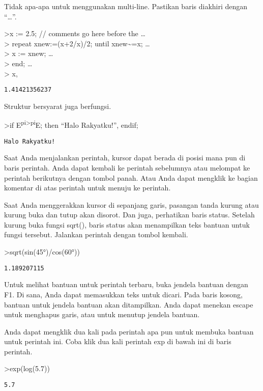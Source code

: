 \documentclass[
]{book}
\begin{document}
Tidak apa-apa untuk menggunakan multi-line. Pastikan baris diakhiri dengan ``\ldots{}''.

\textgreater x := 2.5; // comments go here before the \ldots{}\\
\textgreater{} repeat xnew:=(x+2/x)/2; until xnew\textasciitilde=x; \ldots{}\\
\textgreater{} x := xnew; \ldots{}\\
\textgreater{} end; \ldots{}\\
\textgreater{} x,

\begin{verbatim}
1.41421356237
\end{verbatim}

Struktur bersyarat juga berfungsi.

\textgreater if E\textsuperscript{pi\textgreater pi}E; then ``Halo Rakyatku!'', endif;

\begin{verbatim}
Halo Rakyatku!
\end{verbatim}

Saat Anda menjalankan perintah, kursor dapat berada di posisi mana pun di baris perintah. Anda dapat kembali ke perintah sebelumnya atau melompat ke perintah berikutnya dengan tombol panah. Atau Anda dapat mengklik ke bagian komentar di atas perintah untuk menuju ke perintah.

Saat Anda menggerakkan kursor di sepanjang garis, pasangan tanda kurung atau kurung buka dan tutup akan disorot. Dan juga, perhatikan baris status. Setelah kurung buka fungsi sqrt(), baris status akan menampilkan teks bantuan untuk fungsi tersebut. Jalankan perintah dengan tombol kembali.

\textgreater sqrt(sin(45°)/cos(60°))

\begin{verbatim}
1.189207115
\end{verbatim}

Untuk melihat bantuan untuk perintah terbaru, buka jendela bantuan dengan F1. Di sana, Anda dapat memasukkan teks untuk dicari. Pada baris kosong, bantuan untuk jendela bantuan akan ditampilkan. Anda dapat menekan escape untuk menghapus garis, atau untuk menutup jendela bantuan.

Anda dapat mengklik dua kali pada perintah apa pun untuk membuka bantuan untuk perintah ini. Coba klik dua kali perintah exp di bawah ini di baris perintah.

\textgreater exp(log(5.7))

\begin{verbatim}
5.7
\end{verbatim}
\end{document}
